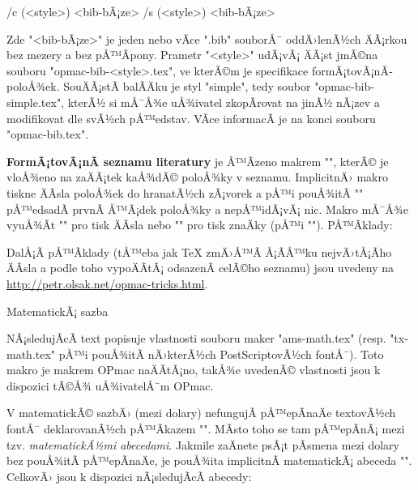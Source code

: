 \begtt
\usebib/c (<style>) <bib-bÃ¡ze> %
\usebib/s (<style>) <bib-bÃ¡ze> %
\endtt

Zde "<bib-bÃ¡ze>" je jeden nebo vÃ­ce ".bib" souborÅ¯ oddÄ›lenÃ½ch ÄÃ¡rkou bez
mezery a bez pÅ™Ã­pony. Prametr "<style>" udÃ¡vÃ¡ ÄÃ¡st jmÃ©na souboru
"opmac-bib-<style>.tex", ve kterÃ©m je specifikace formÃ¡tovÃ¡nÃ­ poloÅ¾ek.
SouÄÃ¡stÃ­ balÃ­Äku je styl "simple", tedy soubor "opmac-bib-simple.tex",
kterÃ½ si mÅ¯Å¾e uÅ¾ivatel zkopÃ­rovat na jinÃ½ nÃ¡zev a modifikovat dle svÃ½ch
pÅ™edstav. VÃ­ce informacÃ­ je na konci souboru "opmac-bib.tex".

\medskip
\noindent 
{\bf FormÃ¡tovÃ¡nÃ­ seznamu literatury} je Å™Ã­zeno makrem "\printbib",
kterÃ© je vloÅ¾eno na zaÄÃ¡tek kaÅ¾dÃ© poloÅ¾ky v seznamu. 
ImplicitnÄ› makro tiskne ÄÃ­sla poloÅ¾ek do
hranatÃ½ch zÃ¡vorek a pÅ™i pouÅ¾itÃ­ "\nonumcitations" pÅ™edsadÃ­ prvnÃ­ Å™Ã¡dek
poloÅ¾ky a nepÅ™idÃ¡vÃ¡ nic. Makro mÅ¯Å¾e vyuÅ¾Ã­t "\the\bibnum" pro tisk 
ÄÃ­sla nebo "\the\bibmark" pro tisk znaÄky (pÅ™i "\nonumcitations").
PÅ™Ã­klady:

\begtt
\def\printbib{\hangindent=\parindent \indent \llap{\the\bibnum. }}

\def\printbib{\hangindent=\parindent \noindent [\the\bibmark]\quad}
\endtt

DalÅ¡Ã­ pÅ™Ã­klady (tÅ™eba jak \TeX{} zmÄ›Å™Ã­ Å¡Ã­Å™ku nejvÄ›tÅ¡Ã­ho ÄÃ­sla a podle toho
vypoÄÃ­tÃ¡ odsazenÃ­ celÃ©ho seznamu) jsou uvedeny na
\url{http://petr.olsak.net/opmac-tricks.html}.

\sec MatematickÃ¡ sazba

NÃ¡sledujÃ­cÃ­ text popisuje vlastnosti souboru maker "ams-math.tex" (resp.
"tx-math.tex" pÅ™i pouÅ¾itÃ­ nÄ›kterÃ½ch PostScriptovÃ½ch fontÅ¯). Toto makro je
makrem OPmac naÄÃ­tÃ¡no, takÅ¾e uvedenÃ© vlastnosti jsou k dispozici tÃ©Å¾
uÅ¾ivatelÅ¯m OPmac.

V matematickÃ© sazbÄ› (mezi dolary) nefungujÃ­ pÅ™epÃ­naÄe textovÃ½ch fontÅ¯
deklarovanÃ½ch pÅ™Ã­kazem "\font". MÃ­sto toho se tam pÅ™epÃ­nÃ¡ mezi tzv. {\it
matematickÃ½mi abecedami}. Jakmile zaÄnete psÃ¡t pÃ­smena
mezi dolary bez pouÅ¾itÃ­ pÅ™epÃ­naÄe, je pouÅ¾ita implicitnÃ­ matematickÃ¡ abeceda
"\mit". CelkovÄ› jsou k dispozici nÃ¡sledujÃ­cÃ­ abecedy:

{\def\tthook{\catcode`\$=3 \catcode`/=0 \medmuskip=0mu \adef{ }{ }}%
\begtt
\mit     %
\it      %
\rm      %
\cal     %
\script  %
\frak    %
\bbchar  %
\bf      %
\bi      %
\endtt
}

